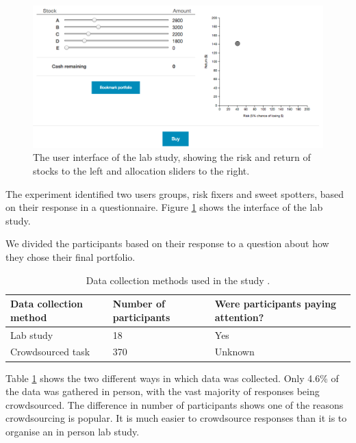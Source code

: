 \documentclass{article}
\begin{document}
\begin{figure}[ht]
    \centering
    \includegraphics[scale=0.3, frame]{Images/interface.png}
    \caption{The user interface of the lab study, showing the risk and return of stocks to the left and allocation sliders to the right.}
    \label{fig:interface}
\end{figure}

The experiment identified two users groups, risk fixers and sweet spotters, based on their response in a questionnaire.
Figure \ref{fig:interface} shows the interface of the lab study.

We divided the participants based on their response to a question
about how they chose their final portfolio. 


\begin{table}[ht]
    \caption{\label{table:studies} Data collection methods used in the study \cite{torsney2018risk}.}
    \small
    \begin{tabular}{lll}
        \hline
        Data collection method & Number of participants & Were participants paying attention? \\    \hline
        Lab study              & 18                     & Yes                                 \\
        Crowdsourced task      & 370                    & Unknown                             \\    \hline
    \end{tabular}
\end{table}

Table \ref{table:studies} shows the two different ways in which data was collected.
Only 4.6\% of the data was gathered in person, with the vast majority of responses being crowdsourced.
The difference in number of participants shows one of the reasons crowdsourcing is popular. 
It is much easier to crowdsource responses than it is to organise an in person lab study.
\end{document}

